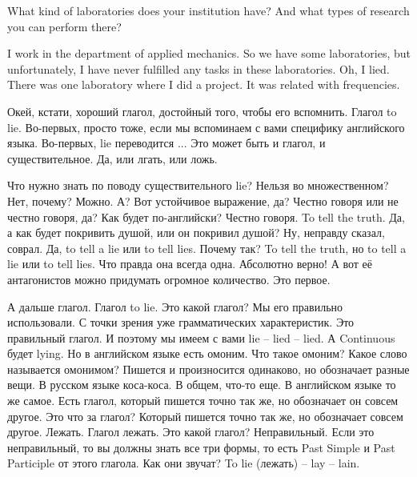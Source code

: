 \documentclass[main.tex]{subfiles}
\begin{document}
What kind of laboratories does your institution have?
And what types of research you can perform there?

I work in the department of applied mechanics.
So we have some laboratories, but unfortunately, I have never fulfilled any tasks in these laboratories.
Oh, I lied.
There was one laboratory where I did a project.
It was related with frequencies.

Окей, кстати, хороший глагол, достойный того, чтобы его вспомнить.
Глагол to lie.
Во-первых, просто тоже, если мы вспоминаем с вами специфику английского языка.
Во-первых, lie переводится ...
Это может быть и глагол, и существительное.
Да, или лгать, или ложь.

Что нужно знать по поводу существительного lie?
Нельзя во множественном?
Нет, почему?
Можно.
А? Вот устойчивое выражение, да? Честно говоря или не честно говоря, да?
Как будет по-английски?
Честно говоря.
To tell the truth.
Да, а как будет покривить душой, или он покривил душой?
Ну, неправду сказал, соврал.
Да, to tell a lie или to tell lies.
Почему так?
To tell the truth, но to tell a lie или to tell lies.
Что правда она всегда одна.
Абсолютно верно!
А вот её антагонистов можно придумать огромное количество.
Это первое.

А дальше глагол.
Глагол to lie.
Это какой глагол?
Мы его правильно использовали.
С точки зрения уже грамматических характеристик.
Это правильный глагол.
И поэтому мы имеем с вами lie -- lied -- lied.
А Continuous будет lying.
Но в английском языке есть омоним.
Что такое омоним?
Какое слово называется омонимом?
Пишется и произносится одинаково, но обозначает разные вещи.
В русском языке коса-коса.
В общем, что-то еще.
В английском языке то же самое.
Есть глагол, который пишется точно так же, но обозначает он совсем другое.
Это что за глагол?
Который пишется точно так же, но обозначает совсем другое.
Лежать.
Глагол лежать.
Это какой глагол?
Неправильный.
Если это неправильный, то вы должны знать все три формы, то есть Past Simple и Past Participle от этого глагола.
Как они звучат?
To lie (лежать) -- lay -- lain.
\end{document}
